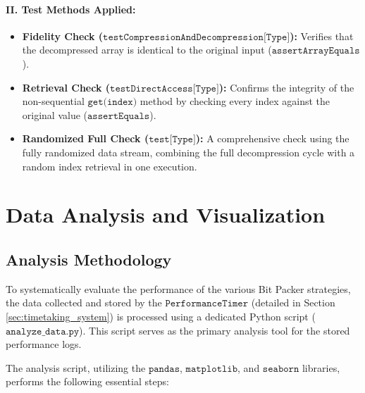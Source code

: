 \documentclass[11pt, a4paper]{article}
\begin{document}
	\paragraph{II. Test Methods Applied:}
	
	\begin{itemize}
		\item \textbf{Fidelity Check ($\texttt{testCompressionAndDecompression[Type]}$):} Verifies that the decompressed array is identical to the original input ($\texttt{assertArrayEquals}$).
		
		\item \textbf{Retrieval Check ($\texttt{testDirectAccess[Type]}$):} Confirms the integrity of the non-sequential $\texttt{get(index)}$ method by checking every index against the original value ($\texttt{assertEquals}$).
		
		\item \textbf{Randomized Full Check ($\texttt{test[Type]}$):} A comprehensive check using the fully randomized data stream, combining the full decompression cycle with a random index retrieval in one execution.
	\end{itemize}
	
	\section{Data Analysis and Visualization}
	\label{sec:data_analysis}
	
	\subsection{Analysis Methodology}
	
	To systematically evaluate the performance of the various Bit Packer strategies, the data collected and stored by the $\texttt{PerformanceTimer}$ (detailed in Section \ref{sec:timetaking_system}) is processed using a dedicated Python script ($\texttt{analyze\_data.py}$). This script serves as the primary analysis tool for the stored performance logs.
	
	The analysis script, utilizing the $\texttt{pandas}$, $\texttt{matplotlib}$, and $\texttt{seaborn}$ libraries, performs the following essential steps:
	
\end{document}
